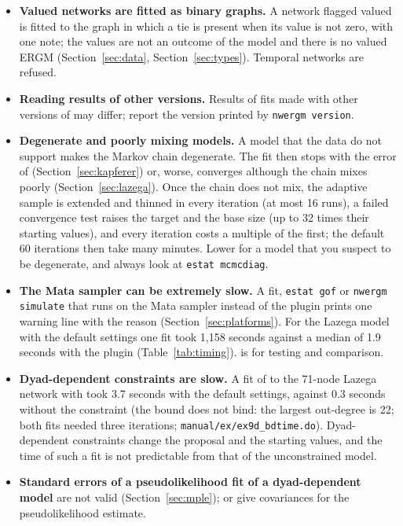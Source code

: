 \begin{itemize}
  \item \textbf{Valued networks are fitted as binary graphs.} A network flagged valued is fitted to the graph in which a tie is present when its value is not zero, with one note; the values are not an outcome of the model and there is no valued ERGM (Section~\ref{sec:data}, Section~\ref{sec:types}). Temporal networks are refused.
  \item \textbf{Reading results of other versions.} Results of fits made with other versions of \nwergm{} may differ; report the version printed by \texttt{nwergm version}.
  \item \textbf{Degenerate and poorly mixing models.} A model that the data do not support makes the Markov chain degenerate. The fit then stops with the error of \ergm{} (Section~\ref{sec:kapferer}) or, worse, converges although the chain mixes poorly (Section~\ref{sec:lazega}). Once the chain does not mix, the adaptive sample is extended and thinned in every iteration (at most 16 runs), a failed convergence test raises the target and the base size (up to 32 times their starting values), and every iteration costs a multiple of the first; the default 60 iterations then take many minutes. Lower  for a model that you suspect to be degenerate, and always look at \texttt{estat mcmcdiag}.
  \item \textbf{The Mata sampler can be extremely slow.} A fit, \texttt{estat gof} or \texttt{nwergm simulate} that runs on the Mata sampler instead of the plugin prints one warning line with the reason (Section~\ref{sec:platforms}). For the Lazega model with the default settings one fit took 1,158 seconds against a median of 1.9 seconds with the plugin (Table~\ref{tab:timing}).  is for testing and comparison.
  \item \textbf{Dyad-dependent constraints are slow.} A fit of  to the 71-node Lazega network with  took 3.7 seconds with the default settings, against 0.3 seconds without the constraint (the bound does not bind: the largest out-degree is 22; both fits needed three iterations; \texttt{manual/ex/ex9d\_bdtime.do}). Dyad-dependent constraints change the proposal and the starting values, and the time of such a fit is not predictable from that of the unconstrained model.
  \item \textbf{Standard errors of a pseudolikelihood fit of a dyad-dependent model} are not valid (Section~\ref{sec:mple});  or  give covariances for the pseudolikelihood estimate.

\end{itemize}
